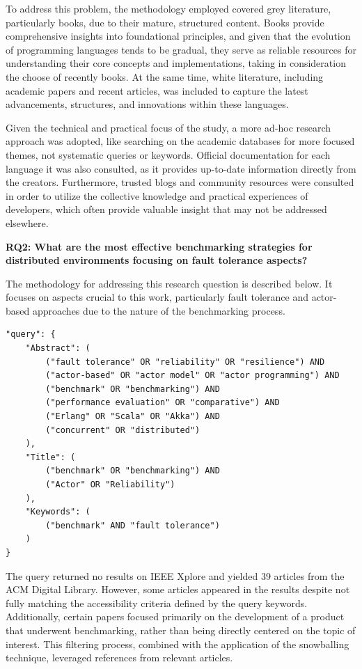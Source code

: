 To address this problem, the methodology employed covered grey literature, particularly books, due to their mature, structured content. Books provide comprehensive insights into foundational principles, and given that the evolution of programming languages tends to be gradual, they serve as reliable resources for understanding their core concepts and implementations, taking in consideration the choose of recently books. At the same time, white literature, including academic papers and recent articles, was included to capture the latest advancements, structures, and innovations within these languages.

Given the technical and practical focus of the study, a more ad-hoc research approach was adopted, like searching on the academic databases for more focused themes, not systematic queries or keywords. Official documentation for each language it was also consulted, as it provides up-to-date information directly from the creators. Furthermore, trusted blogs and community resources were consulted in order to utilize the collective knowledge and practical experiences of developers, which often provide valuable insight that may not be addressed elsewhere.

\textbf{RQ2: What are the most effective benchmarking strategies for distributed environments focusing on fault tolerance aspects?}

The methodology for addressing this research question is described below. It focuses on aspects crucial to this work, particularly fault tolerance and actor-based approaches due to the nature of the benchmarking process.

\begin{verbatim}
"query": {
    "Abstract": (
        ("fault tolerance" OR "reliability" OR "resilience") AND 
        ("actor-based" OR "actor model" OR "actor programming") AND 
        ("benchmark" OR "benchmarking") AND 
        ("performance evaluation" OR "comparative") AND 
        ("Erlang" OR "Scala" OR "Akka") AND 
        ("concurrent" OR "distributed")
    ),
    "Title": (
        ("benchmark" OR "benchmarking") AND 
        ("Actor" OR "Reliability")
    ),
    "Keywords": (
        ("benchmark" AND "fault tolerance")
    )
}
\end{verbatim}

The query returned no results on IEEE Xplore and yielded 39 articles from the ACM Digital Library. However, some articles appeared in the results despite not fully matching the accessibility criteria defined by the query keywords. Additionally, certain papers focused primarily on the development of a product that underwent benchmarking, rather than being directly centered on the topic of interest. This filtering process, combined with the application of the snowballing technique, leveraged references from relevant articles. 

